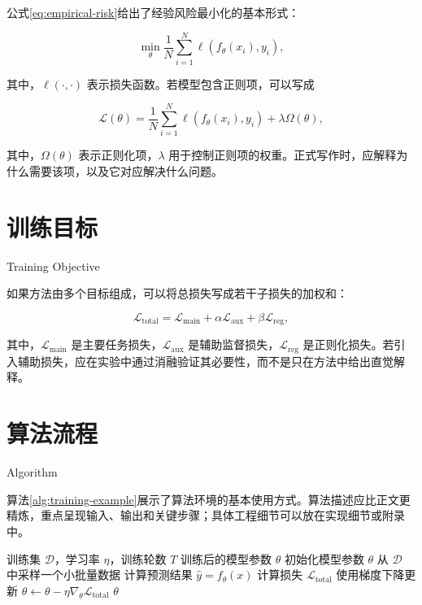 公式\eqref{eq:empirical-risk}给出了经验风险最小化的基本形式：

\begin{equation}
    \min_{\theta}\frac{1}{N}\sum_{i=1}^{N}\ell(f_\theta(x_i), y_i),
    \label{eq:empirical-risk}
\end{equation}

其中，$\ell(\cdot,\cdot)$ 表示损失函数。若模型包含正则项，可以写成

\begin{equation}
    \mathcal{L}(\theta)=
    \frac{1}{N}\sum_{i=1}^{N}\ell(f_\theta(x_i), y_i)
    +\lambda\Omega(\theta),
    \label{eq:regularized-objective}
\end{equation}

其中，$\Omega(\theta)$ 表示正则化项，$\lambda$ 用于控制正则项的权重。正式写作时，应解释为什么需要该项，以及它对应解决什么问题。

\section{训练目标}{Training Objective}

如果方法由多个目标组成，可以将总损失写成若干子损失的加权和：

\begin{equation}
    \mathcal{L}_{\mathrm{total}}
    =\mathcal{L}_{\mathrm{main}}
    +\alpha\mathcal{L}_{\mathrm{aux}}
    +\beta\mathcal{L}_{\mathrm{reg}},
    \label{eq:total-loss}
\end{equation}

其中，$\mathcal{L}_{\mathrm{main}}$ 是主要任务损失，$\mathcal{L}_{\mathrm{aux}}$ 是辅助监督损失，$\mathcal{L}_{\mathrm{reg}}$ 是正则化损失。若引入辅助损失，应在实验中通过消融验证其必要性，而不是只在方法中给出直觉解释。

\section{算法流程}{Algorithm}

算法\ref{alg:training-example}展示了算法环境的基本使用方式。算法描述应比正文更精炼，重点呈现输入、输出和关键步骤；具体工程细节可以放在实现细节或附录中。

\begin{algorithm}[htbp]
    \caption{训练流程示例}
    \label{alg:training-example}
    \begin{algorithmic}[1]
        \Require 训练集 $\mathcal{D}$，学习率 $\eta$，训练轮数 $T$
        \Ensure 训练后的模型参数 $\theta$
        \State 初始化模型参数 $\theta$
            \State 从 $\mathcal{D}$ 中采样一个小批量数据
            \State 计算预测结果 $\hat{y}=f_\theta(x)$
            \State 计算损失 $\mathcal{L}_{\mathrm{total}}$
            \State 使用梯度下降更新 $\theta \leftarrow \theta-\eta\nabla_\theta \mathcal{L}_{\mathrm{total}}$
        \EndFor
        \State \Return $\theta$
    \end{algorithmic}
\end{algorithm}


